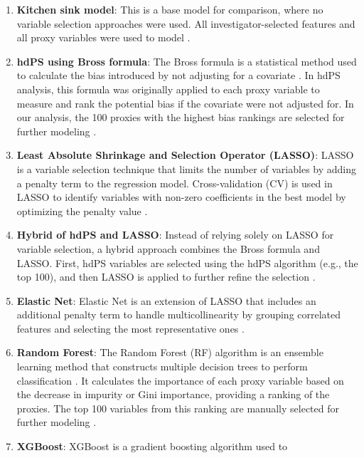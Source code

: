 \documentclass[sn-vancouver,Numbered,lineno,pdflatex]{sn-jnl}
\begin{document}
\begin{enumerate}
\def\labelenumi{\arabic{enumi}.}
\item
  \textbf{Kitchen sink model}: This is a base model for comparison,
  where no variable selection approaches were used. All
  investigator-selected features and all proxy variables were used to
  model \citep{karim2018can}.
\item
  \textbf{hdPS using Bross formula}: The Bross formula is a statistical
  method used to calculate the bias introduced by not adjusting for a
  covariate \citep{bross1966spurious}. In hdPS analysis, this formula
  was originally applied to each proxy variable to measure and rank the
  potential bias if the covariate were not adjusted for. In our
  analysis, the 100 proxies with the highest bias rankings are selected
  for further modeling \citep{schneeweiss2009high, wyss2018erratum}.
\item
  \textbf{Least Absolute Shrinkage and Selection Operator (LASSO)}:
  LASSO is a variable selection technique that limits the number of
  variables by adding a penalty term to the regression model.
  Cross-validation (CV) is used in LASSO to identify variables with
  non-zero coefficients in the best model by optimizing the penalty
  value
  \citep{franklin2015regularized, schneeweiss2017variable, karim2018can}.
\item
  \textbf{Hybrid of hdPS and LASSO}: Instead of relying solely on LASSO
  for variable selection, a hybrid approach combines the Bross formula
  and LASSO. First, hdPS variables are selected using the hdPS algorithm
  (e.g., the top 100), and then LASSO is applied to further refine the
  selection \citep{karim2018can, franklin2015regularized}.
\item
  \textbf{Elastic Net}: Elastic Net is an extension of LASSO that
  includes an additional penalty term to handle multicollinearity by
  grouping correlated features and selecting the most representative
  ones \citep{karim2018can}.
\item
  \textbf{Random Forest}: The Random Forest (RF) algorithm is an
  ensemble learning method that constructs multiple decision trees to
  perform classification \citep{breiman2001random}. It calculates the
  importance of each proxy variable based on the decrease in impurity or
  Gini importance, providing a ranking of the proxies. The top 100
  variables from this ranking are manually selected for further modeling
  \citep{schneeweiss2017variable}.
\item
  \textbf{XGBoost}: XGBoost is a gradient boosting algorithm used to

\end{enumerate}
\end{document}
